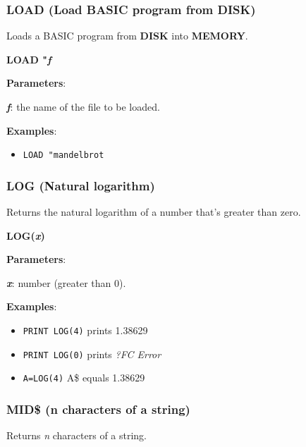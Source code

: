     \subsubsection{{LOAD (Load BASIC program from DISK)}}
    \label{msbasic:lang:load}
    Loads a BASIC program from \textbf{DISK} into \textbf{MEMORY}.

    \hspace{1.9cm}\textbf{LOAD "\textit{f}}

    \textbf{Parameters}:

    \hspace{1cm}\textbf{\textit{f}}: the name of the file to be loaded.

    \textbf{Examples}:
    \begin{itemize}
        \item \texttt{LOAD "mandelbrot}
    \end{itemize}

    \subsubsection{{LOG (Natural logarithm)}}
    \label{msbasic:lang:log}
    Returns the natural logarithm of a number that's greater than zero.

    \hspace{1.9cm}\textbf{LOG(\textit{x})}

    \textbf{Parameters}:

    \hspace{1cm}\textbf{\textit{x}}: number (greater than 0).

    \textbf{Examples}:
    \begin{itemize}
        \item \texttt{PRINT LOG(4)} prints 1.38629
        \item \texttt{PRINT LOG(0)} prints \textit{?FC Error}
        \item \texttt{A=LOG(4)} A\$ equals 1.38629
    \end{itemize}

    \subsubsection{{MID\$ (n characters of a string)}}
    \label{msbasic:lang:mid}
    Returns \textit{n} characters of a string.

